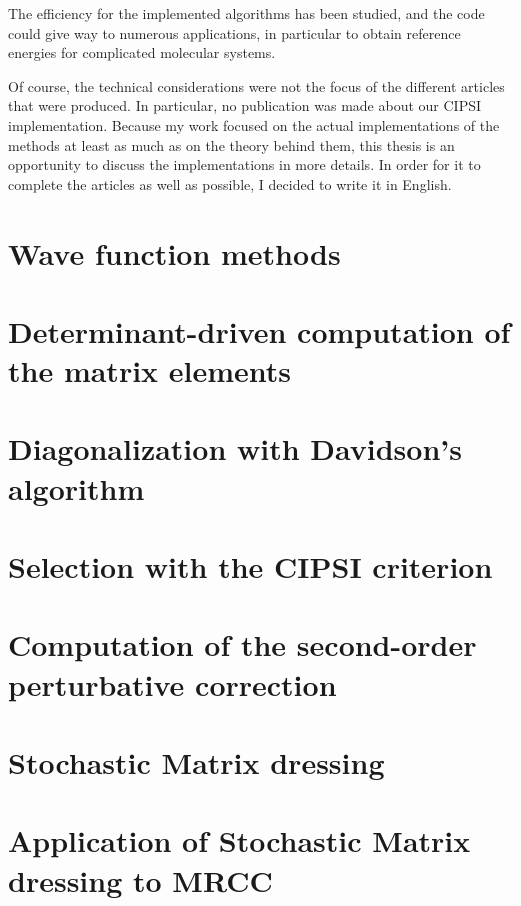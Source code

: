 \documentclass[12pt,a4paper]{report}
\begin{document}
The efficiency for the implemented algorithms has been studied, and the code could give way to numerous applications, in particular to obtain reference energies for complicated molecular systems.

Of course, the technical considerations were not the focus of the different articles that were produced. In particular, no publication was made about our CIPSI implementation. Because my work focused on the actual implementations of the methods at least as much as on the theory behind them, this thesis is an opportunity to discuss the implementations in more details. In order for it to complete the articles as well as possible, I decided to write it in English.



\chapter{Wave function methods}
\minitoc


\chapter{Determinant-driven computation of the matrix elements}
\minitoc


\chapter{Diagonalization with Davidson's algorithm}
\minitoc


\chapter{Selection with the CIPSI criterion}
\minitoc


\chapter{Computation of the second-order perturbative correction}
\minitoc


\chapter{Stochastic Matrix dressing}
\minitoc


\chapter{Application of Stochastic Matrix dressing to MRCC}
\minitoc

\end{document}
